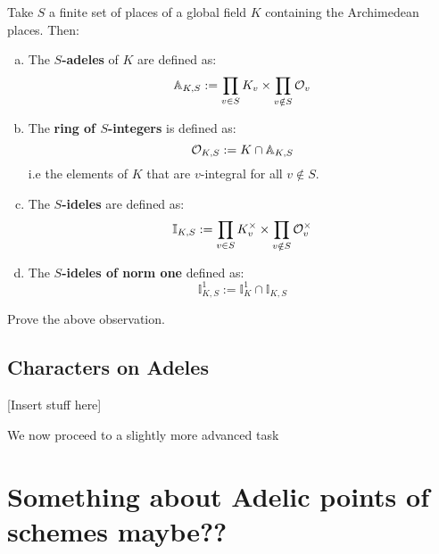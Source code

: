 \documentclass[11pt, x11names, openany]{book}
\renewcommand{\aa}{\mathbb{A}}
\newcommand{\ii}{\mathbb{I}}
\begin{document}
\begin{defn}
Take $S$ a finite set of places of a global field $K$ containing the Archimedean places. Then:
\begin{enumerate}[(a)]
    \item The \textbf{$S$-adeles} of $K$ are defined as:
    \begin{equation*}
        \aa_{K, S} := \prod_{v \in S} K_v \times \prod_{v \notin S} \calo_v
    \end{equation*}
    \item The \textbf{ring of $S$-integers} is defined as:
    \begin{equation*}
        \calo_{K, S} := K \cap \aa_{K, S}
    \end{equation*}
    i.e the elements of $K$ that are $v$-integral for all $v \notin S$.
    \item The \textbf{$S$-ideles} are defined as:
    \begin{equation*}
        \ii_{K, S} := \prod_{v \in S}K_v^\times \times \prod_{v \notin S}\calo_v^\times 
    \end{equation*}
    \item The \textbf{$S$-ideles of norm one} defined as:
    \begin{equation*}
        \ii_{K, S}^1 := \ii_K^1 \cap \ii_{K, S}
    \end{equation*}
\end{enumerate}
\end{defn}

\begin{observation}

\end{observation}

\begin{exercise}
    Prove the above observation.
\end{exercise}

\subsection{Characters on Adeles}
\label{subsection: Characters on Adeles}


[Insert stuff here]

We now proceed to a slightly more advanced task


\section{Something about Adelic points of schemes maybe??}
\end{document}
